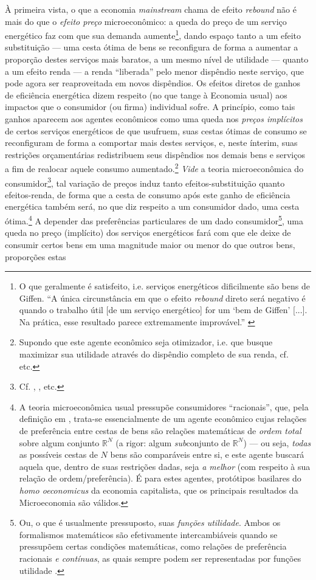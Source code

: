 À primeira vista, o que a economia \textit{mainstream} chama de efeito \textit{rebound} não é mais do que o \textit{efeito preço} microeconômico: a queda do preço de um serviço energético faz com que sua demanda aumente\footnote{O que geralmente é satisfeito, i.e. serviços energéticos dificilmente são bens de Giffen. ``A única circunstância em que o efeito \textit{rebound} direto será negativo é quando o trabalho útil [de um serviço energético] for um `bem de Giffen' [...]. Na prática, esse resultado parece extremamente improvável.'' \parencite[p. 20]{Sorrell2007}}, dando espaço tanto a um efeito substituição --- uma cesta ótima de bens se reconfigura de forma a aumentar a proporção destes serviços mais baratos, a um mesmo nível de utilidade --- quanto a um efeito renda --- a renda ``liberada'' pelo menor dispêndio neste serviço, que pode agora ser reaproveitada em novos dispêndios. Os efeitos diretos de ganhos de eficiência energética dizem respeito (no que tange à Economia usual) aos impactos que o consumidor (ou firma) individual sofre. A princípio, como tais ganhos aparecem aos agentes econômicos como uma queda nos \textit{preços implícitos} de certos serviços energéticos de que usufruem, suas cestas ótimas de consumo se reconfiguram de forma a comportar mais destes serviços, e, neste ínterim, suas restrições orçamentárias redistribuem seus dispêndios nos demais bens e serviços a fim de realocar aquele consumo aumentado.\footnote{Supondo que este agente econômico seja otimizador, i.e. que busque maximizar sua utilidade através do dispêndio completo de sua renda, cf. \parencite{Mas-Colell1995} etc.} \textit{Vide} a teoria microeconômica do consumidor\footnote{Cf. \textcite{Varian2014}, \textcite{Mas-Colell1995}, \textcite{Cowell2004} etc.}, tal variação de preços induz tanto efeitos-substituição quanto efeitos-renda, de forma que a cesta de consumo após este ganho de eficiência energética também será, no que diz respeito a um consumidor dado, uma cesta ótima.\footnote{A teoria microeconômica usual pressupõe consumidores ``racionais'', que, pela definição em \textcite{Mas-Colell1995}, trata-se essencialmente de um agente econômico cujas relações de preferência entre cestas de bens são relações matemáticas de \textit{ordem total} sobre algum conjunto $\mathbb{R}^{N}$ (a rigor: algum \textit{sub}conjunto de $\mathbb{R}^{N}$) --- ou seja, \textit{todas} as possíveis cestas de $N$ bens são comparáveis entre si, e este agente buscará aquela que, dentro de suas restrições dadas, seja \textit{a melhor} (com respeito à sua relação de ordem/preferência). É para estes agentes, protótipos basilares do \textit{homo oeconomicus} da economia capitalista, que os principais resultados da Microeconomia são válidos.} A depender das preferências particulares de um dado consumidor\footnote{Ou, o que é usualmente pressuposto, suas \textit{funções utilidade}. Ambos os formalismos matemáticos são efetivamente intercambiáveis quando se pressupõem certas condições matemáticas, como relações de preferência racionais \textit{e contínuas}, as quais sempre podem ser representadas por funções utilidade \parencite{Mas-Colell1995}.}, uma queda no preço (implícito) dos serviços energéticos fará com que ele deixe de consumir certos bens em uma magnitude maior ou menor do que outros bens, proporções estas 